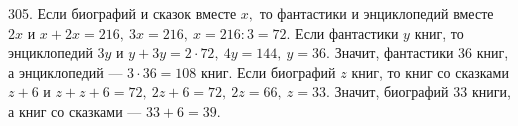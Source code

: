 305. Если биографий и сказок вместе $x,$ то фантастики и энциклопедий вместе $2x$ и $x+2x=216,\ 3x=216,\ x=216:3=72.$ Если фантастики $y$ книг, то энциклопедий $3y$ и $y+3y=2\cdot72,\ 4y=144,\ y=36.$ Значит, фантастики 36 книг, а энциклопедий --- $3\cdot36=108$ книг. Если биографий $z$ книг, то книг со сказками $z+6$ и $z+z+6=72,\ 2z+6=72,\ 2z=66,\ z=33.$ Значит, биографий 33 книги, а книг со сказками --- $33+6=39.$\\
